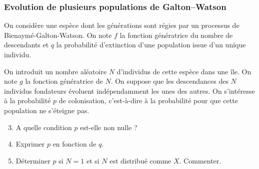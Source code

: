 \subsubsection{Evolution de plusieurs populations de Galton–Watson}

On considère une espèce dont les générations sont régies par un processus de Bienaymé-Galton-Watson. On note $f$ la fonction génératrice du nombre de descendants et $q$ la probabilité d'extinction d'une population issue d'un unique individu.

On introduit un nombre aléatoire $N$ d'individus de cette espèce dans une île. On note $g$ la fonction génératrice de $N$. On suppose que les descendances des $N$ individus fondateurs évoluent indépendamment les unes des autres. On s'intéresse à la probabilité $p$ de colonisation, c'est-à-dire à la probabilité pour que cette population ne s'éteigne pas.
\begin{enumerate}
  \setcounter{enumi}{2}
  \item A quelle condition $p$ est-elle non nulle ?
  \item Exprimer $p$ en fonction de $q$. 
  \item Déterminer $p$ si $N = 1$ et si $N$ est distribué comme $X$. Commenter.
\end{enumerate}

